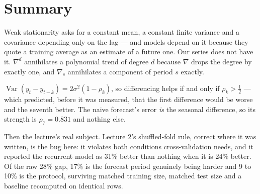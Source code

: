 \documentclass[11pt,a4paper]{article}
\begin{document}
\section*{Summary}

Weak stationarity asks for a constant mean, a constant finite variance and a
covariance depending only on the lag --- and models depend on it because they
quote a training average as an estimate of a future one. Our series does not
have it. $\nabla^d$ annihilates a polynomial trend of degree $d$ because
$\nabla$ drops the degree by exactly one, and $\nabla_s$ annihilates a
component of period $s$ exactly.

$\operatorname{Var}(y_t - y_{t-k}) = 2\sigma^2(1-\rho_k)$, so differencing
helps if and only if $\rho_k > \tfrac12$ --- which predicted, before it was
measured, that the first difference would be worse and the seventh better. The
naive forecast's error \emph{is} the seasonal difference, so its strength is
$\rho_7 = 0.831$ and nothing else.

Then the lecture's real subject. Lecture 2's shuffled-fold rule, correct where
it was written, is the bug here: it violates both conditions cross-validation
needs, and it reported the recurrent model as 31\% better than nothing when it
is 24\% better. Of the raw 28\% gap, 17\% is the forecast period genuinely
being harder and 9 to 10\% is the protocol, surviving matched training size,
matched test size and a baseline recomputed on identical rows.
\end{document}
